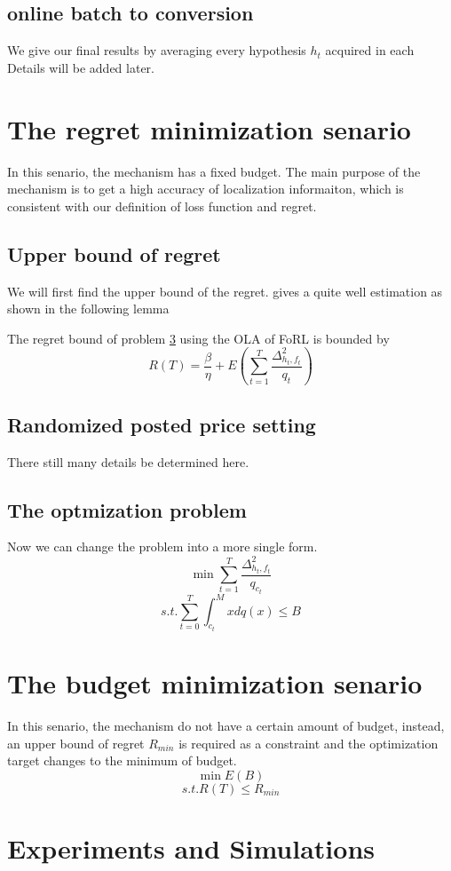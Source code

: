 \documentclass[10pt,conference,compsocconf,letterpaper]{IEEEtran}
\begin{document}
\subsection{online batch to conversion}
We give our final results by averaging every hypothesis $h_t$ acquired in each 
Details will be added later.
\section{The regret minimization senario}
In this senario, the mechanism has a fixed budget. The main purpose of the mechanism is to get a high accuracy of localization informaiton, which is consistent with our definition of loss function and regret. 
\subsection{Upper bound of regret}
We will first find the upper bound of the regret. \cite{} gives a quite well estimation as shown in the following lemma
\begin{Lemma}{}
The regret bound of problem \ref{} using the OLA of FoRL is bounded by
\[R(T)=\frac{\beta}{\eta}+E(\sum_{t=1}^T\frac{\Delta_{h_t,f_t}^2}{q_t})\]
\end{Lemma}
\subsection{Randomized posted price setting}
There still many details be determined here.
\subsection{The optmization problem}
Now we can change the problem into a more single form.
\[\min \sum_{t=1}^T\frac{\Delta_{h_t,f_t}^2}{q_{c_t}}\]
\[s.t. \sum_{t=0}^T\int_{c_t}^Mxdq(x)\leq B\]
\section{The budget minimization senario}
In this senario, the mechanism do not have a certain amount of budget, instead, an upper bound of regret $R_{min}$ is required as a constraint and the optimization target changes to the minimum of budget.
\[\min E(B)\]
\[s.t. R(T)\leq R_{min}\]
\section{Experiments and Simulations}
\end{document}
